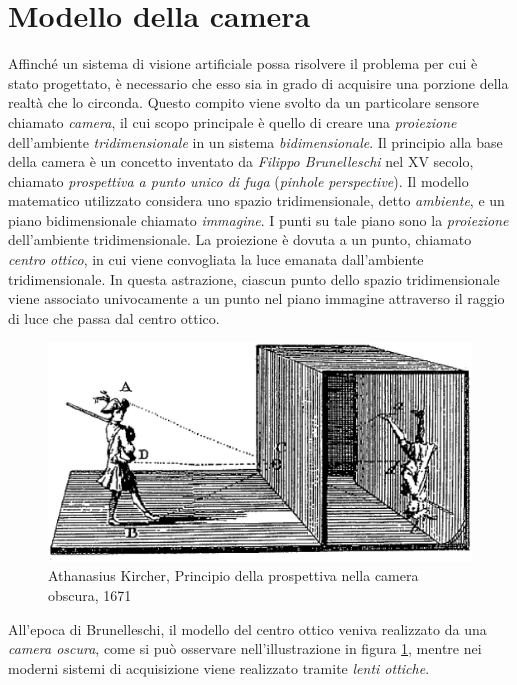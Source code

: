 \section{Modello della camera}
Affinch\'e un sistema di visione artificiale possa risolvere il problema per cui \`e stato progettato, \`e necessario che esso sia in grado di acquisire una porzione della realt\`a che lo circonda.
Questo compito viene svolto da un particolare sensore chiamato \textit{camera}, il cui scopo principale \`e quello di creare una \textit{proiezione} dell'ambiente \textit{tridimensionale} in un sistema \textit{bidimensionale}.
Il principio alla base della camera \`e un concetto inventato da \textit{Filippo Brunelleschi} nel XV secolo, chiamato \textit{prospettiva a punto unico di fuga} (\textit{pinhole perspective}).
Il modello matematico utilizzato considera uno spazio tridimensionale, detto \textit{ambiente}, e un piano bidimensionale chiamato \textit{immagine}. 
I punti su tale piano sono la \textit{proiezione} dell'ambiente tridimensionale.
La proiezione \`e dovuta a un punto, chiamato \textit{centro ottico}, in cui viene convogliata la luce emanata dall'ambiente tridimensionale.
In questa astrazione, ciascun punto dello spazio tridimensionale viene associato univocamente a un punto nel piano immagine attraverso il raggio di luce che passa dal centro ottico.
\begin{figure}
	\centering
	\includegraphics[width=12cm]{./pictures/cameraObscura}
	\caption{Athanasius Kircher, Principio della prospettiva nella camera obscura, 1671}
	\label{fig:prospettiva}
\end{figure} 
All'epoca di Brunelleschi, il modello del centro ottico veniva realizzato da una \textit{camera oscura}, come si pu\`o osservare nell'illustrazione in figura \ref{fig:prospettiva}, mentre nei moderni sistemi di acquisizione viene realizzato tramite \textit{lenti ottiche}. 
